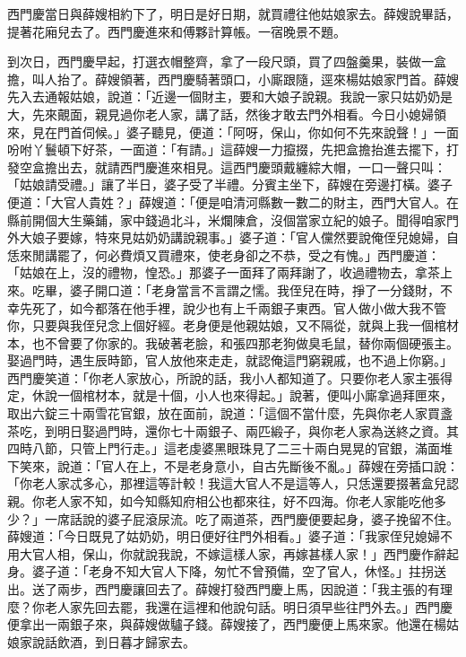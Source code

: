 \begin{showcontents}{}
西門慶當日與薛嫂相約下了，明日是好日期，就買禮往他姑娘家去。薛嫂說畢話，提著花廂兒去了。西門慶進來和傅夥計算帳。一宿晚景不題。

到次日，西門慶早起，打選衣帽整齊，拿了一段尺頭，買了四盤羹果，裝做一盒擔，叫人抬了。薛嫂領著，西門慶騎著頭口，小廝跟隨，逕來楊姑娘家門首。薛嫂先入去通報姑娘，說道：「近邊一個財主，要和大娘子說親。我說一家只姑奶奶是大，先來覿面，親見過你老人家，講了話，然後才敢去門外相看。今日小媳婦領來，見在門首伺候。」婆子聽見，便道：「阿呀，保山，你如何不先來說聲！」一面吩咐丫鬟頓下好茶，一面道：「有請。」這薛嫂一力攛掇，先把盒擔抬進去擺下，打發空盒擔出去，就請西門慶進來相見。這西門慶頭戴纏綜大帽，一口一聲只叫：「姑娘請受禮。」讓了半日，婆子受了半禮。分賓主坐下，薛嫂在旁邊打橫。婆子便道：「大官人貴姓？」薛嫂道：「便是咱清河縣數一數二的財主，西門大官人。在縣前開個大生藥鋪，家中錢過北斗，米爛陳倉，沒個當家立紀的娘子。聞得咱家門外大娘子要嫁，特來見姑奶奶講說親事。」婆子道：「官人儻然要說俺侄兒媳婦，自恁來閒講罷了，何必費煩又買禮來，使老身卻之不恭，受之有愧。」西門慶道： 「姑娘在上，沒的禮物，惶恐。」那婆子一面拜了兩拜謝了，收過禮物去，拿茶上來。吃畢，婆子開口道：「老身當言不言謂之懦。我侄兒在時，掙了一分錢財，不幸先死了，如今都落在他手裡，說少也有上千兩銀子東西。官人做小做大我不管你，只要與我侄兒念上個好經。老身便是他親姑娘，又不隔從，就與上我一個棺材本，也不曾要了你家的。我破著老臉，和張四那老狗做臭毛鼠，替你兩個硬張主。娶過門時，遇生辰時節，官人放他來走走，就認俺這門窮親戚，也不過上你窮。」 西門慶笑道：「你老人家放心，所說的話，我小人都知道了。只要你老人家主張得定，休說一個棺材本，就是十個，小人也來得起。」說著，便叫小廝拿過拜匣來，取出六錠三十兩雪花官銀，放在面前，說道：「這個不當什麼，先與你老人家買盞茶吃，到明日娶過門時，還你七十兩銀子、兩匹緞子，與你老人家為送終之資。其四時八節，只管上門行走。」這老虔婆黑眼珠見了二三十兩白晃晃的官銀，滿面堆下笑來，說道：「官人在上，不是老身意小，自古先斷後不亂。」薛嫂在旁插口說：「你老人家忒多心，那裡這等計較！我這大官人不是這等人，只恁還要掇著盒兒認親。你老人家不知，如今知縣知府相公也都來往，好不四海。你老人家能吃他多少？」一席話說的婆子屁滾尿流。吃了兩道茶，西門慶便要起身，婆子挽留不住。薛嫂道：「今日既見了姑奶奶，明日便好往門外相看。」婆子道：「我家侄兒媳婦不用大官人相，保山，你就說我說，不嫁這樣人家，再嫁甚樣人家！」西門慶作辭起身。婆子道：「老身不知大官人下降，匆忙不曾預備，空了官人，休怪。」拄拐送出。送了兩步，西門慶讓回去了。薛嫂打發西門慶上馬，因說道：「我主張的有理麼？你老人家先回去罷，我還在這裡和他說句話。明日須早些往門外去。」西門慶便拿出一兩銀子來，與薛嫂做驢子錢。薛嫂接了，西門慶便上馬來家。他還在楊姑娘家說話飲酒，到日暮才歸家去。


\end{showcontents}
